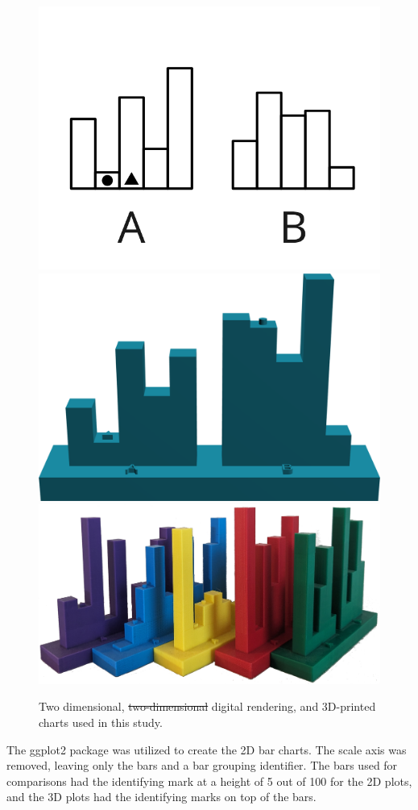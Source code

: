 \documentclass[letterpaper,inpress,dvipsnames]{jdsart}
\providecommand{\DIFadd}[1]{{\protect\color{blue}\uwave{#1}}} %
\providecommand{\DIFdel}[1]{{\protect\color{red}\sout{#1}}}                      %
\providecommand{\DIFaddFL}[1]{\DIFadd{#1}} %
\providecommand{\DIFdelFL}[1]{\DIFdel{#1}} %
\providecommand{\DIFaddbeginFL}{} %
\providecommand{\DIFaddendFL}{} %
\providecommand{\DIFdelbeginFL}{} %
\providecommand{\DIFdelendFL}{} %
\begin{document}
\begin{figure}
\DIFdelbeginFL %
\DIFdelendFL \DIFaddbeginFL \includegraphics[width=0.3\linewidth]{_images/Type1-Rep01} \includegraphics[width=0.3\linewidth]{_images/RenderedChart} \includegraphics[width=0.35\linewidth]{_images/Kit_of_charts} \DIFaddendFL \caption{Two dimensional, \DIFdelbeginFL \DIFdelFL{two-dimensional }\DIFdelendFL \DIFaddbeginFL \DIFaddFL{3D }\DIFaddendFL digital rendering, and 3D-printed charts used in this study.}\label{fig:plotTypes}
\end{figure}

The ggplot2 \citep{ggplot2} package was utilized to create the 2D bar charts.
The scale axis was removed, leaving only the bars and a bar grouping identifier.
The bars used for comparisons had the identifying mark at a height of 5 out of 100 for the 2D plots, and the 3D plots had the identifying marks on top of the bars.
\end{document}
